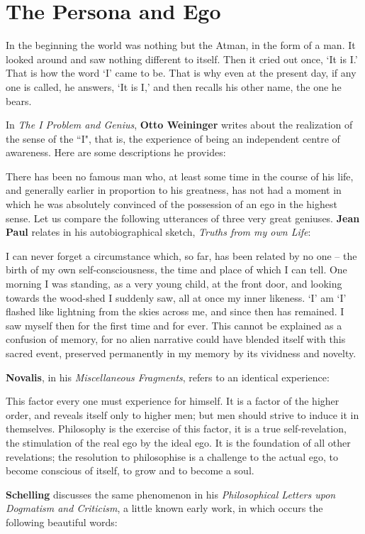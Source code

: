 \section{The Persona and Ego}

\begin{quotex}
In the beginning the world was nothing but the Atman, in the form of a man. It looked around and saw nothing different to itself. Then it cried out once, `It is I.' That is how the word `I' came to be. That is why even at the present day, if any one is called, he answers, `It is I,' and then recalls his other name, the one he bears. 

\end{quotex}
In \emph{The I Problem and Genius}, \textbf{Otto Weininger} writes about the realization of the sense of the ``I", that is, the experience of being an independent centre of awareness. Here are some descriptions he provides:

There has been no famous man who, at least some time in the course of his life, and generally earlier in proportion to his greatness, has not had a moment in which he was absolutely convinced of the possession of an ego in the highest sense. Let us compare the following utterances of three very great geniuses. \textbf{Jean Paul} relates in his autobiographical sketch, \emph{Truths from my own Life}:

\begin{quotex}
I can never forget a circumstance which, so far, has been related by no one – the birth of my own self-consciousness, the time and place of which I can tell. One morning I was standing, as a very young child, at the front door, and looking towards the wood-shed I suddenly saw, all at once my inner likeness. `I' am `I' flashed like lightning from the skies across me, and since then has remained. I saw myself then for the first time and for ever. This cannot be explained as a confusion of memory, for no alien narrative could have blended itself with this sacred event, preserved permanently in my memory by its vividness and novelty. 

\end{quotex}
\textbf{Novalis}, in his \emph{Miscellaneous Fragments}, refers to an identical experience:

\begin{quotex}
This factor every one must experience for himself. It is a factor of the higher order, and reveals itself only to higher men; but men should strive to induce it in themselves. Philosophy is the exercise of this factor, it is a true self-revelation, the stimulation of the real ego by the ideal ego. It is the foundation of all other revelations; the resolution to philosophise is a challenge to the actual ego, to become conscious of itself, to grow and to become a soul. 

\end{quotex}
\textbf{Schelling} discusses the same phenomenon in his \emph{Philosophical Letters upon Dogmatism and Criticism}, a little known early work, in which occurs the following beautiful words:

